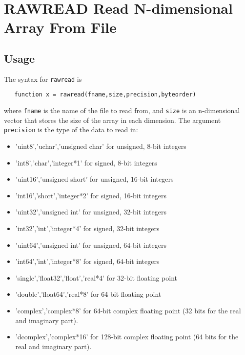 \section{RAWREAD Read N-dimensional Array From File}

\subsection{Usage}

The syntax for \verb|rawread| is
\begin{verbatim}
   function x = rawread(fname,size,precision,byteorder)
\end{verbatim}
where \verb|fname| is the name of the file to read from, 
and \verb|size| is an n-dimensional vector that stores the
size of the array in each dimension.  The argument \verb|precision|
is the type of the data to read in:
\begin{itemize}
\item  'uint8','uchar','unsigned char' for unsigned, 8-bit integers

\item  'int8','char','integer*1' for signed, 8-bit integers

\item  'uint16','unsigned short' for unsigned, 16-bit  integers

\item  'int16','short','integer*2' for  signed, 16-bit integers

\item  'uint32','unsigned int' for unsigned, 32-bit integers

\item  'int32','int','integer*4' for signed, 32-bit integers

\item  'uint64','unsigned int' for unsigned, 64-bit integers

\item  'int64','int','integer*8' for signed, 64-bit integers

\item  'single','float32','float','real*4' for 32-bit floating point

\item  'double','float64','real*8' for 64-bit floating point

\item  'complex','complex*8' for  64-bit complex floating point (32 bits 
         for the real and imaginary part).

\item  'dcomplex','complex*16' for 128-bit complex floating point (64
         bits for the real and imaginary part).

\end{itemize}
